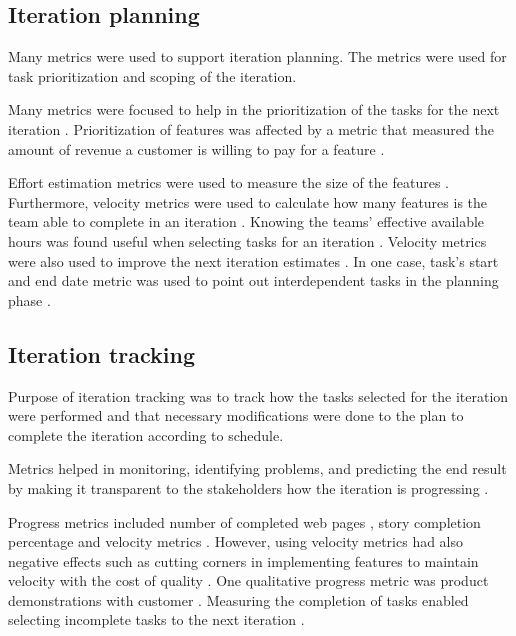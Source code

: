 \documentclass{sig-alternate}
\newcommand{\eetu}[1]{\ignorespaces}
\newcommand{\juha}[1]{\ignorespaces}
\begin{document}
\subsection{Iteration planning}
\label{sec:IterationPlanning}
Many metrics were used to support iteration planning. The metrics were used
for task prioritization and scoping of the iteration.

Many metrics were focused to help in the prioritization of the tasks for the
next iteration \cite{Greening2010,Haugen200623,Hodgkins2007194}.
Prioritization of features was affected by a metric that measured the amount
of revenue a customer is willing to pay for a feature \cite{Hodgkins2007194}.

Effort estimation metrics were used to measure the size of the features
\cite{Elssamadisy2002617}.
Furthermore, velocity metrics were used to calculate how many features is the
team able to complete in an iteration \cite{Polk2011263}. Knowing the teams'
effective available hours was found useful when selecting tasks for an
iteration \cite{Cheng200929}.
Velocity metrics were also used to improve the next iteration estimates
\cite{Mahnic201273}.
In one case, task's start and end date metric was used to point out
interdependent tasks in the planning phase \cite{Hong2010310}.


\subsection{Iteration tracking} %
\label{sec:IterationTracking}
Purpose of iteration tracking was to track how the tasks selected for the
iteration were performed and that necessary modifications were done to the
plan to complete the iteration according to schedule.

Metrics helped in monitoring, identifying problems, and predicting the end
result by making it transparent to the stakeholders how the iteration is
progressing
\cite{Petersen2011975,Talby2006100,Mahnic201273,Dubinsky200512,Hong2010310,Green2011,Trapa2006243,Trimble20134826}.

Progress metrics included number of completed web pages \cite{Hong2010310},
story completion percentage \cite{Trapa2006243} and velocity metrics
\cite{Dubinsky200512}.
However, using velocity metrics had also negative effects such as cutting corners in
implementing features to maintain velocity with the cost of quality
\cite{Elssamadisy2002617}. One qualitative progress metric was product
demonstrations with customer \cite{Trimble20134826}. Measuring the completion
of tasks enabled selecting incomplete tasks to the next iteration
\cite{Hong2010310}.
\end{document}
